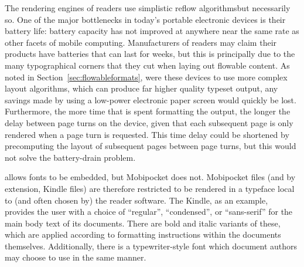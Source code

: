 The rendering engines of \ebook{} readers use simplistic reflow algorithms\ed but necessarily so. One of the major bottlenecks in today's portable electronic devices is their battery life: battery capacity has not improved at anywhere near the same rate as other facets of mobile computing. Manufacturers of \ebook{} readers may claim their products have batteries that can last for weeks, but this is principally due to the many typographical corners that they cut when laying out flowable content. As noted in Section~\ref{sec:flowableformats}, were these devices to use more complex layout algorithms, which can produce far higher quality typeset output, any savings made by using a low-power electronic paper screen would quickly be lost. Furthermore, the more time that is spent formatting the output, the longer the delay between page turns on the device, given that each subsequent page is only rendered when a page turn is requested. This time delay could be shortened by precomputing the layout of subsequent pages between page turns, but this would not solve the battery-drain problem.


\epub{} allows fonts to be embedded, but Mobipocket does not. Mobipocket files (and by extension, Kindle files) are therefore restricted to be rendered in a typeface local to (and often chosen by) the reader software. The Kindle, as an example, provides the user with a choice of ``regular'', ``condensed'', or ``sans-serif'' for the main body text of its documents. There are bold and italic variants of these, which are applied according to formatting instructions within the documents themselves. Additionally, there is a typewriter-style font which document authors may choose to use in the same manner.

